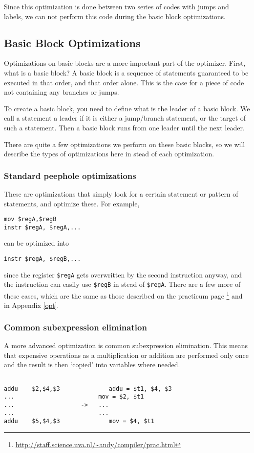 \documentclass[10pt,a4paper]{article}
\begin{document}
Since this optimization is done between two series of codes with jumps and
labels, we can not perform this code during the basic block optimizations.

\subsection{Basic Block Optimizations}

Optimizations on basic blocks are a more important part of the optimizer.
First, what is a basic block? A basic block is a sequence of statements
guaranteed to be executed in that order, and that order alone. This is the case
for a piece of code not containing any branches or jumps.

To create a basic block, you need to define what is the leader of a basic
block. We call a statement a leader if it is either a jump/branch statement, or
the target of such a statement. Then a basic block runs from one leader until
the next leader.

There are quite a few optimizations we perform on these basic blocks, so we
will describe the types of optimizations here in stead of each optimization.

\subsubsection*{Standard peephole optimizations}

These are optimizations that simply look for a certain statement or pattern of
statements, and optimize these. For example,
\begin{verbatim}
mov $regA,$regB
instr $regA, $regA,...
\end{verbatim}
can be optimized into
\begin{verbatim}
instr $regA, $regB,...
\end{verbatim}
since the register \texttt{\$regA} gets overwritten by the second instruction
anyway, and the instruction can easily use \texttt{\$regB} in stead of
\texttt{\$regA}. There are a few more of these cases, which are the same as
those described on the practicum page
\footnote{\url{http://staff.science.uva.nl/~andy/compiler/prac.html}} and in
Appendix \ref{opt}.

\subsubsection*{Common subexpression elimination}

A more advanced optimization is common subexpression elimination. This means
that expensive operations as a multiplication or addition are performed only
once and the result is then `copied' into variables where needed.
\begin{verbatim}

addu	$2,$4,$3              addu = $t1, $4, $3
...                        mov = $2, $t1
...                   ->   ...
...                        ...
addu	$5,$4,$3              mov = $4, $t1

\end{verbatim}
\end{document}
